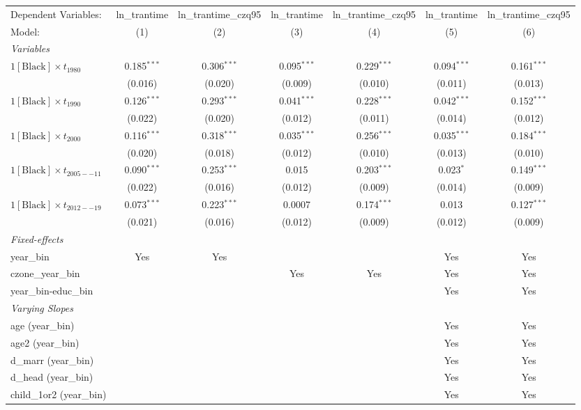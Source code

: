 \begin{tabular}{lcccccc}
\tabularnewline\midrule\midrule
Dependent Variables:&ln\_trantime&ln\_trantime\_czq95&ln\_trantime&ln\_trantime\_czq95&ln\_trantime&ln\_trantime\_czq95\\
Model:&(1) & (2) & (3) & (4) & (5) & (6)\\
\midrule \emph{Variables}&   &   &   &   &   &  \\
$1[\text{Black}] \times t_{1980}$ & 0.185$^{***}$ & 0.306$^{***}$ & 0.095$^{***}$ & 0.229$^{***}$ & 0.094$^{***}$ & 0.161$^{***}$\\
  &(0.016) & (0.020) & (0.009) & (0.010) & (0.011) & (0.013)\\
$1[\text{Black}] \times t_{1990}$ & 0.126$^{***}$ & 0.293$^{***}$ & 0.041$^{***}$ & 0.228$^{***}$ & 0.042$^{***}$ & 0.152$^{***}$\\
  &(0.022) & (0.020) & (0.012) & (0.011) & (0.014) & (0.012)\\
$1[\text{Black}] \times t_{2000}$ & 0.116$^{***}$ & 0.318$^{***}$ & 0.035$^{***}$ & 0.256$^{***}$ & 0.035$^{***}$ & 0.184$^{***}$\\
  &(0.020) & (0.018) & (0.012) & (0.010) & (0.013) & (0.010)\\
$1[\text{Black}] \times t_{2005--11}$ & 0.090$^{***}$ & 0.253$^{***}$ & 0.015 & 0.203$^{***}$ & 0.023$^{*}$ & 0.149$^{***}$\\
  &(0.022) & (0.016) & (0.012) & (0.009) & (0.014) & (0.009)\\
$1[\text{Black}] \times t_{2012--19}$ & 0.073$^{***}$ & 0.223$^{***}$ & 0.0007 & 0.174$^{***}$ & 0.013 & 0.127$^{***}$\\
  &(0.021) & (0.016) & (0.012) & (0.009) & (0.012) & (0.009)\\
\midrule \emph{Fixed-effects}&   &   &   &   &   &  \\
year\_bin & Yes & Yes &  &  & Yes & Yes\\
czone\_year\_bin &  &  & Yes & Yes & Yes & Yes\\
year\_bin-educ\_bin &  &  &  &  & Yes & Yes\\
\midrule \emph{Varying Slopes}&   &   &   &   &   &  \\
age (year\_bin) &  &  &  &  & Yes & Yes\\
age2 (year\_bin) &  &  &  &  & Yes & Yes\\
d\_marr (year\_bin) &  &  &  &  & Yes & Yes\\
d\_head (year\_bin) &  &  &  &  & Yes & Yes\\
child\_1or2 (year\_bin) &  &  &  &  & Yes & Yes\\

\end{tabular}
